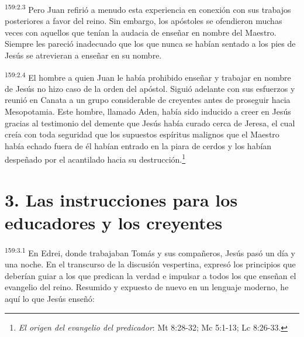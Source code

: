 \par 
\textsuperscript{159:2.3} Pero Juan refirió a menudo esta experiencia en conexión con sus trabajos posteriores a favor del reino. Sin embargo, los apóstoles se ofendieron muchas veces con aquellos que tenían la audacia de enseñar en nombre del Maestro. Siempre les pareció inadecuado que los que nunca se habían sentado a los pies de Jesús se atrevieran a enseñar en su nombre.

\par 
\textsuperscript{159:2.4} El hombre a quien Juan le había prohibido enseñar y trabajar en nombre de Jesús no hizo caso de la orden del apóstol. Siguió adelante con sus esfuerzos y reunió en Canata a un grupo considerable de creyentes antes de proseguir hacia Mesopotamia. Este hombre, llamado Aden, había sido inducido a creer en Jesús gracias al testimonio del demente que Jesús había curado cerca de Jeresa, el cual creía con toda seguridad que los supuestos espíritus malignos que el Maestro había echado fuera de él habían entrado en la piara de cerdos y los habían despeñado por el acantilado hacia su destrucción.\footnote{\textit{El origen del evangelio del predicador}: Mt 8:28-32; Mc 5:1-13; Lc 8:26-33.}

\section*{3. Las instrucciones para los educadores y los creyentes}
\par 
\textsuperscript{159:3.1} En Edrei, donde trabajaban Tomás y sus compañeros, Jesús pasó un día y una noche. En el transcurso de la discusión vespertina, expresó los principios que deberían guiar a los que predican la verdad e impulsar a todos los que enseñan el evangelio del reino. Resumido y expuesto de nuevo en un lenguaje moderno, he aquí lo que Jesús enseñó:

